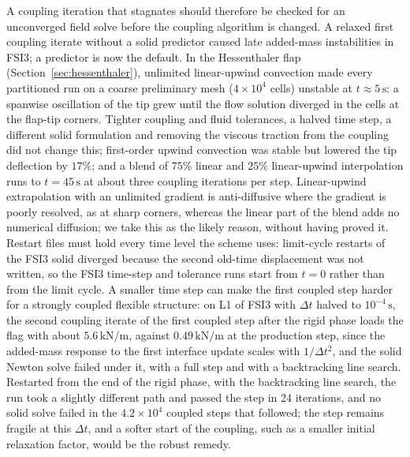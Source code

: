 A coupling iteration that stagnates should therefore be checked for an unconverged field solve before the coupling algorithm is changed.
A relaxed first coupling iterate without a solid predictor caused late added-mass instabilities in FSI3; a predictor is now the default.
In the Hessenthaler flap (Section~\ref{sec:hessenthaler}), unlimited linear-upwind convection made every partitioned run on a coarse preliminary mesh ($4\times10^{4}$ cells) unstable at $t \approx 5\,\mathrm{s}$: a spanwise oscillation of the tip grew until the flow solution diverged in the cells at the flap-tip corners. Tighter coupling and fluid tolerances, a halved time step, a different solid formulation and removing the viscous traction from the coupling did not change this; first-order upwind convection was stable but lowered the tip deflection by $17\%$; and a blend of $75\%$ linear and $25\%$ linear-upwind interpolation runs to $t = 45\,\mathrm{s}$ at about three coupling iterations per step. Linear-upwind extrapolation with an unlimited gradient is anti-diffusive where the gradient is poorly resolved, as at sharp corners, whereas the linear part of the blend adds no numerical diffusion; we take this as the likely reason, without having proved it.
Restart files must hold every time level the scheme uses: limit-cycle restarts of the FSI3 solid diverged because the second old-time displacement was not written, so the FSI3 time-step and tolerance runs start from $t = 0$ rather than from the limit cycle.
A smaller time step can make the first coupled step harder for a strongly coupled flexible structure: on L1 of FSI3 with $\Delta t$ halved to $10^{-4}\,\mathrm{s}$, the second coupling iterate of the first coupled step after the rigid phase loads the flag with about $5.6\,\mathrm{kN/m}$, against $0.49\,\mathrm{kN/m}$ at the production step, since the added-mass response to the first interface update scales with $1/\Delta t^2$, and the solid Newton solve failed under it, with a full step and with a backtracking line search. Restarted from the end of the rigid phase, with the backtracking line search, the run took a slightly different path and passed the step in 24 iterations, and no solid solve failed in the $4.2\times10^{4}$ coupled steps that followed; the step remains fragile at this $\Delta t$, and a softer start of the coupling, such as a smaller initial relaxation factor, would be the robust remedy.

